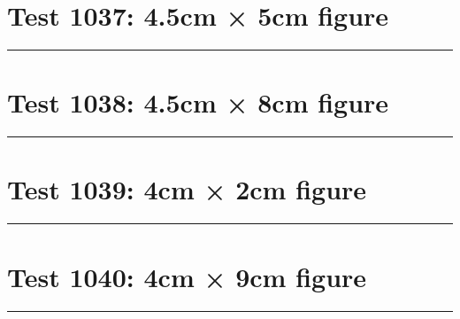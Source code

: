\documentclass[a4paper,11pt]{article}
\begin{document}
\section*{Test 1037: 4.5cm × 5cm figure}
\begin{swarmwrap}%
  \begin{minipage}[t]{4cm}
    \centering
    \rule{\linewidth}{5cm}
  \end{minipage}%
\end{swarmwrap}%
\swarmwrapnext
\lipsum[90]
\lipsum[91]
\lipsum[92]
\lipsum[93]
\lipsum[94]
\lipsum[95]
\section*{Test 1038: 4.5cm × 8cm figure}
\begin{swarmwrap}%
  \begin{minipage}[t]{4cm}
    \centering
    \rule{\linewidth}{8cm}
  \end{minipage}%
\end{swarmwrap}%
\swarmwrapnext
\lipsum[144]
\lipsum[145]
\lipsum[146]
\lipsum[147]
\section*{Test 1039: 4cm × 2cm figure}
\begin{swarmwrap}%
  \begin{minipage}[t]{4cm}
    \centering
    \rule{\linewidth}{2cm}
  \end{minipage}%
\end{swarmwrap}%
\swarmwrapnext
\lipsum[42]
\lipsum[43]
\lipsum[44]
\section*{Test 1040: 4cm × 9cm figure}
\begin{swarmwrap}%
  \begin{minipage}[t]{4cm}
    \centering
    \rule{\linewidth}{9cm}
  \end{minipage}%
\end{swarmwrap}%
\swarmwrapnext
\lipsum[44]
\lipsum[45]
\lipsum[46]
\lipsum[47]
\lipsum[48]
\lipsum[49]
\end{document}
